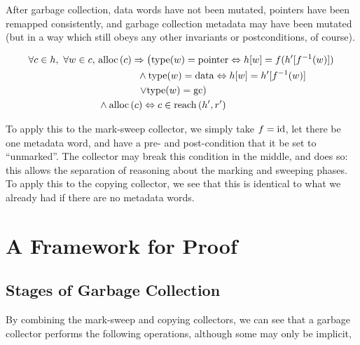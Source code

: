 \begin{definition}[Preservation]
  \label{def:g-preservation}
  After garbage collection, data words have not been mutated, pointers
  have been remapped consistently, and garbage collection metadata may
  have been mutated (but in a way which still obeys any other
  invariants or postconditions, of course).

  \begin{align*}
    \forall c \in h,\ \forall w \in c,\ &\mathrm{alloc}\left(c\right) \Rightarrow
    \left(\mathrm{type}(w) = \mathrm{pointer} \Leftrightarrow h[w] = f(h'[f^{-1}(w)])\right.\\
    &\quad\quad\quad\quad \land \mathrm{type}(w) = \mathrm{data}
    \Leftrightarrow h[w] = h'[f^{-1}(w)]\\
    &\quad\quad\quad\quad \left.\lor \mathrm{type}(w) = \mathrm{gc}\right)\\
    &\land \mathrm{alloc}\left(c\right) \Leftrightarrow c \in \mathrm{reach}\left(h', r'\right)
  \end{align*}
\end{definition}

To apply this to the mark-sweep collector, we simply take $f = \mathrm{id}$,
let there be one metadata word, and have a pre- and post-condition
that it be set to ``unmarked''. The collector may break this condition
in the middle, and does so: this allows the separation of reasoning
about the marking and sweeping phases. To apply this to the copying
collector, we see that this is identical to what we already had if
there are no metadata words.

\section{A Framework for Proof}
\label{sec:gc-framework}


\subsection{Stages of Garbage Collection}
\label{sec:gc-framework-stages}

By combining the mark-sweep and copying collectors, we can see that
a garbage collector performs the following operations, although some
may only be implicit,

